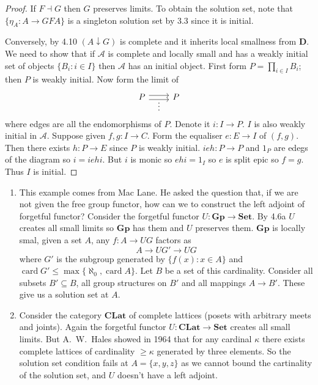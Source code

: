 \documentclass[a4paper]{article}
\renewcommand{\c}[1]{\mathbf{#1}}
\newcommand{\Set}{{\c{Set}}}
\newcommand{\adjoint}{\dashv}
\begin{document}
\begin{proof}
  If \(F \adjoint G\) then \(G\) preserves limits. To obtain the solution set, note that \(\{\eta_A: A \to GFA\}\) is a singleton solution set by 3.3 since it is initial.

  Conversely, by 4.10 \((A \downarrow G)\) is complete and it inherits local smallness from \(\c D\). We need to show that if \(\mathcal A\) is complete and locally small and has a weakly initial set of objects \(\{B_i: i \in I\}\) then \(\mathcal A\) has an initial object. First form \(P = \prod_{i \in I} B_i\); then \(P\) is weakly initial. Now form the limit of
  \[
    \begin{tikzcd}
      P \ar[r, shift left, "\vdots"'] \ar[r, shift right] & P
    \end{tikzcd}
  \]
  where edges are all the endomorphisms of \(P\). Denote it \(i: I \to P\). \(I\) is also weakly initial in \(\mathcal A\). Suppose given \(f, g: I \to C\). Form the equaliser \(e: E \to I\) of \((f, g)\). Then there exists \(h: P \to E\) since \(P\) is weakly initial. \(ieh: P \to P\) and \(1_P\) are edegs of the diagram so \(i = iehi\). But \(i\) is monic so \(ehi = 1_I\) so \(e\) is split epic so \(f = g\). Thus \(I\) is initial.
\end{proof}

\begin{eg}\leavevmode
  \begin{enumerate}
  \item This example comes from Mac Lane. He asked the question that, if we are not given the free group functor, how can we to construct the left adjoint of forgetful functor? Consider the forgetful functor \(U: \c{Gp} \to \Set\). By 4.6a \(U\) creates all small limits so \(\c{Gp}\) has them and \(U\) preserves them. \(\c{Gp}\) is locally smal, given a set \(A\), any \(f: A \to UG\) factors as
    \[
      A \to UG' \to UG
    \]
    where \(G'\) is the subgroup generated by \(\{f(x): x \in A\}\) and \(\operatorname{card} G' \leq \max\{\aleph_0, \operatorname{card} A\}\). Let \(B\) be a set of this cardinality. Consider all subsets \(B' \subseteq B\), all group structures on \(B'\) and all mappings \(A \to B'\). These give us a solution set at \(A\). %
  \item Consider the category \(\c{CLat}\) of complete lattices (posets with arbitrary meets and joints). Again the forgetful functor \(U: \c{CLat} \to \Set\) creates all small limits. But A.\ W.\ Hales showed in 1964 that for any cardinal \(\kappa\) there exists complete lattices of cardinality \(\geq \kappa\) generated by three elements. So the solution set condition fails at \(A = \{x, y, z\}\) as we cannot bound the cartinality of the solution set, and \(U\) doesn't have a left adjoint.
  \end{enumerate}
\end{eg}
\end{document}
